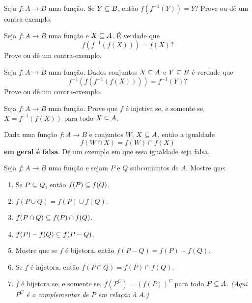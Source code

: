 \documentclass[12pt]{exam}
\begin{document}
    \vspace{.3cm}

    \questao{} Seja $f : A \to B$ uma função. Se $Y \subseteq B$, então $f(f^{-1}(Y)) = Y$? Prove ou d\^e um contra-exemplo.

    \vspace{.3cm}

    \questao{} Seja $f : A \to B$ uma função e $X \subseteq A$. É verdade que
    \[
        f(f^{-1}(f(X))) = f(X)?
    \]
    Prove ou d\^e um contra-exemplo.

    \vspace{.3cm}

    \questao{} Seja $f : A \to B$ uma função. Dados conjuntos $X \subseteq A$ e $Y \subseteq B$ é verdade que
    \[
        f^{-1}(f(f^{-1}(f(X)))) = f^{-1}(Y)?
    \]
    Prove ou d\^e um contra-exemplo.

    \vspace{.3cm}

    \questao{} Seja $f : A \to B$ uma função. Prove que $f$ é injetiva se, e somente se, $X = f^{-1}(f(X))$ para todo $X \subseteq A$.

    \vspace{.3cm}

    \questao{} Dada uma função $f : A \to B$ e conjuntos $W$, $X \subseteq A$, então a igualdade
    \[
        f(W \cap X) = f(W) \cap f(X)
    \]
    \textbf{em geral é falsa}. D\^e um exemplo em que essa igualdade seja falsa.

    \vspace{.3cm}

    \questao{} Seja $f : A \to B$ uma função e sejam $P$ e $Q$ subconjuntos de $A$. Mostre que:
    \begin{enumerate}[label={\alph*})]
        \item Se $P\subseteq Q$, então $f(P)\subseteq f(Q)$.
        \item $f(P\cup Q) = f(P)\cup f(Q)$.

        \item $f(P\cap Q)\subseteq f(P)\cap f(Q)$.

        \item $f(P) - f(Q) \subseteq f(P - Q)$.

        \item Mostre que se $f$ é bijetora, então $f(P - Q) = f(P) - f(Q)$.

        \item Se $f$ é injetora, então $f(P\cap Q) =  f(P)\cap f(Q)$.

        \item $f$ é bijetora se, e somente se, $f(P^C) = (f(P))^C$ para todo $P \subseteq A$. \textit{(Aqui $P^C$ é o complementar de $P$ em relação \`a $A$.)}
    \end{enumerate}
\end{document}
